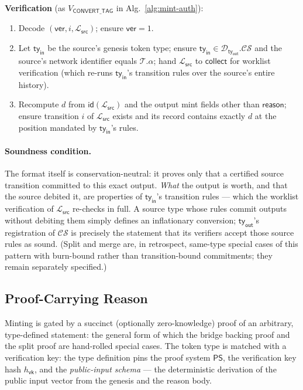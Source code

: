 \textbf{Verification} (as $V_{\mathsf{CONVERT\_TAG}}$ in Alg.~\ref{alg:mint-auth}):
\begin{enumerate}
	\item Decode $(\mathsf{ver}, i, \mathcal{L}_\mathsf{src})$; ensure $\mathsf{ver} = 1$.
	\item Let $\mathsf{ty}_\mathsf{in}$ be the source's genesis token type; ensure $\mathsf{ty}_\mathsf{in} \in \mathcal{D}_{\mathsf{ty}_\mathsf{out}}.\mathcal{CS}$ and the source's network identifier equals $\mathcal{T}.\alpha$; hand $\mathcal{L}_\mathsf{src}$ to $\mathsf{collect}$ for worklist verification (which re-runs $\mathsf{ty}_\mathsf{in}$'s transition rules over the source's entire history).
	\item Recompute $d$ from $\mathsf{id}(\mathcal{L}_\mathsf{src})$ and the output mint fields other than $\mathsf{reason}$; ensure transition $i$ of $\mathcal{L}_\mathsf{src}$ exists and its record contains exactly $d$ at the position mandated by $\mathsf{ty}_\mathsf{in}$'s rules.
\end{enumerate}

\paragraph{Soundness condition.} The format itself is conservation-neutral: it proves only that a certified source transition committed to this exact output. \emph{What} the output is worth, and that the source debited it, are properties of $\mathsf{ty}_\mathsf{in}$'s transition rules --- which the worklist verification of $\mathcal{L}_\mathsf{src}$ re-checks in full. A source type whose rules commit outputs without debiting them simply defines an inflationary conversion; $\mathsf{ty}_\mathsf{out}$'s registration of $\mathcal{CS}$ is precisely the statement that its verifiers accept those source rules as sound. (Split and merge are, in retrospect, same-type special cases of this pattern with burn-bound rather than transition-bound commitments; they remain separately specified.)

\subsection{Proof-Carrying Reason}\label{app:reason-proof}

Minting is gated by a succinct (optionally zero-knowledge) proof of an arbitrary, type-defined statement: the general form of which the bridge backing proof and the split proof are hand-rolled special cases. The token type is matched with a verification key: the type definition pins the proof system $\mathsf{PS}$, the verification key hash $h_\mathsf{vk}$, and the \emph{public-input schema} --- the deterministic derivation of the public input vector from the genesis and the reason body.

